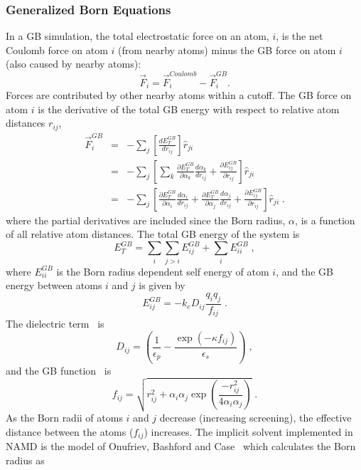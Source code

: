 \subsubsection{Generalized Born Equations}
In a GB simulation, the total electrostatic force on an atom, $i$, is the net Coulomb force on atom $i$ (from nearby atoms) minus the GB force on atom $i$ (also caused by nearby atoms):
$$
\vec{F}_i = \vec{F}_i^{Coulomb} - \vec{F}_i^{GB}.
$$
Forces are contributed by other nearby atoms within a cutoff.
The GB force on atom $i$ is the derivative of the total GB energy with respect to relative atom distances $r_{ij}$,
\begin{eqnarray}
\vec{F}_i^{GB}&=&-\sum_j \left[  \frac{d E_T^{GB}}{d r_{ij}}  \right]  \hat{r}_{ji} \\
&=&-\sum_j \left[  \sum_k \frac{\partial E_T^{GB}}{\partial \alpha_k}\frac{d \alpha_k}{d r_{ij}} + \frac{\partial E_{ij}^{GB}}{\partial r_{ij}}  \right]  \hat{r}_{ji} \\
&=&-\sum_j \left[  \frac{\partial E_T^{GB}}{\partial \alpha_i}\frac{d \alpha_i}{d r_{ij}}+\frac{\partial E_T^{GB}}{\partial \alpha_j}\frac{d \alpha_j}{d r_{ij}}+ \frac{\partial E_{ij}^{GB}}{\partial r_{ij}}  \right]  \hat{r}_{ji} \; .
\end{eqnarray}
where the partial derivatives are included since the Born radius, $\alpha$, is a function of all relative atom distances.
The total GB energy of the system is
\begin{equation}
E_T^{GB} = \sum_i \sum_{j>i} E_{ij}^{GB} + \sum_{i} E_{ii}^{GB} \; ,
\end{equation}
where $E_{ii}^{GB}$ is the Born radius dependent self energy of atom $i$, and the GB energy between atoms $i$ and $j$ is given by
\begin{equation}
E^{GB}_{ij} = - k_e D_{ij} \frac{q_i q_j}{f_{ij}} \; .
\end{equation}
The dielectric term~\cite{SRIN99} is
\begin{equation}
D_{ij} = \left( \frac{1}{\epsilon_p} - \frac{\exp{\left(-\kappa f_{ij}\right)}}{\epsilon_s} \right) \; ,
\end{equation}
and the GB function~\cite{STIL90} is
\begin{equation}
f_{ij} = \sqrt{r_{ij}^2 + \alpha_i \alpha_j \exp{\left(\frac{-r_{ij}^2}{4 \alpha_i \alpha_j}\right)}} \; .
\end{equation}
As the Born radii of atoms $i$ and $j$ decrease (increasing screening), the effective distance between the atoms ($f_{ij}$) increases.
The implicit solvent implemented in NAMD is the model of Onufriev, Bashford and Case~\cite{ONUF00, ONUF04} which calculates the Born radius as
